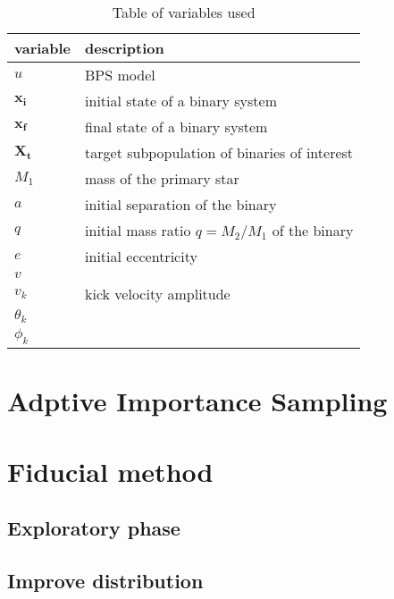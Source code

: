 \begin{table}[]
\centering
\caption{Table of variables used }
\label{my-label}
\begin{tabular}{l|l}
\hline
\textbf{variable}               & \textbf{description}           \\ \hline
\multicolumn{1}{|l|}{$u$} & \multicolumn{1}{l|}{BPS model} \\ \hline
\multicolumn{1}{|l|}{$\mathbf{x_i}$} & \multicolumn{1}{l|}{initial state of a binary system} \\ \hline
\multicolumn{1}{|l|}{$\mathbf{x_f}$} & \multicolumn{1}{l|}{final state of a binary system} \\ \hline
\multicolumn{1}{|l|}{$\mathbf{X_t}$} & \multicolumn{1}{l|}{target subpopulation of binaries of interest} \\ \hline
\multicolumn{1}{|l|}{$M_1$}  & \multicolumn{1}{l|}{mass of the primary star} \\ \hline
\multicolumn{1}{|l|}{$a$} & \multicolumn{1}{l|}{initial separation of the binary } \\ \hline
\multicolumn{1}{|l|}{$q$} & \multicolumn{1}{l|}{initial mass ratio $q = M_2 / M_1 $ of the binary} \\ \hline
\multicolumn{1}{|l|}{$e$} & \multicolumn{1}{l|}{initial eccentricity} \\ \hline
\multicolumn{1}{|l|}{$v$} & \multicolumn{1}{l|}{} \\ \hline
\multicolumn{1}{|l|}{$v_k$} & \multicolumn{1}{l|}{kick velocity amplitude} \\ \hline
\multicolumn{1}{|l|}{$\theta_k$} & \multicolumn{1}{l|}{} \\ \hline
\multicolumn{1}{|l|}{$\phi_k$} & \multicolumn{1}{l|}{} \\ \hline
\end{tabular}
\end{table}



\section{Adptive Importance Sampling}
\section{Fiducial method}
\subsection{Exploratory phase}
\subsection{Improve distribution}
